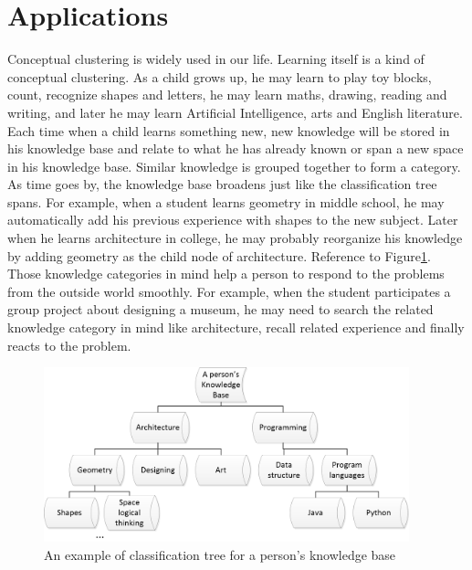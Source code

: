 %
%
%

\section{Applications}
Conceptual clustering is widely used in our life. Learning itself is a kind of conceptual clustering. As a child grows up, he may learn to play toy blocks, count, recognize shapes and letters, he may learn maths, drawing, reading and writing, and later he may learn Artificial Intelligence, arts and English literature. Each time when a child learns something new, new knowledge will be stored in his knowledge base and relate to what he has already known or span a new space in his knowledge base. Similar knowledge is grouped together to form a category. As time goes by, the knowledge base broadens just like the classification tree spans. For example, when a student learns geometry in middle school, he may automatically add his previous experience with shapes to the new subject. Later when he learns architecture in college, he may probably reorganize his knowledge by adding geometry as the child node of architecture. Reference to Figure\ref{Fig:app1}. Those knowledge categories in mind help a person to respond to the problems from the outside world smoothly. For example, when the student participates a group project about designing a museum, he may need to search the related knowledge category in mind like architecture, recall related experience and finally reacts to the problem.

\begin{figure}[h!]
    \centering
    \includegraphics[width=300pt]{../images/app1.jpg}
    \caption{An example of classification tree for a person's knowledge base}
    \label{Fig:app1}
	\end{figure}
	
